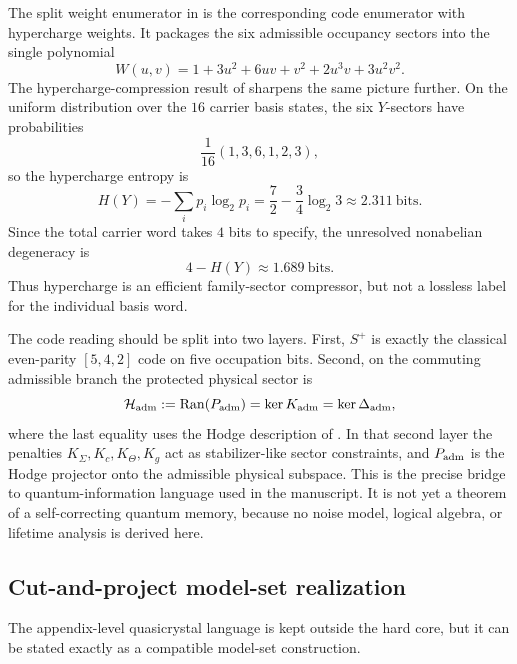 The split weight enumerator in  is the corresponding code enumerator with hypercharge weights. It packages the six admissible occupancy sectors into the single polynomial
\[
W(u,v)
=
1+3u^2+6uv+v^2+2u^3v+3u^2v^2.
\]
The hypercharge-compression result of  sharpens the same picture further. On the uniform distribution over the $16$ carrier basis states, the six $Y$-sectors have probabilities
\[
\frac1{16}(1,3,6,1,2,3),
\]
so the hypercharge entropy is
\[
H(Y)
=
-\sum_i p_i\log_2 p_i
=
\frac72-\frac34\log_2 3
\approx
\num{2.311}\ \text{bits}.
\]
Since the total carrier word takes $4$ bits to specify, the unresolved nonabelian degeneracy is
\[
4-H(Y)\approx \num{1.689}\ \text{bits}.
\]
Thus hypercharge is an efficient family-sector compressor, but not a lossless label for the individual basis word.

\begin{remark}
The code reading should be split into two layers. First, $S^+$ is exactly the classical even-parity $[5,4,2]$ code on five occupation bits. Second, on the commuting admissible branch the protected physical sector is
\[
\mathcal H_{\mathrm{adm}}
:=
\operatorname{Ran}(P_{\mathrm{adm}})
=
\ker K_{\mathrm{adm}}
=
\ker \Delta_{\mathrm{adm}},
\]
where the last equality uses the Hodge description of . In that second layer the penalties $K_\Sigma,K_c,K_\Theta,K_g$ act as stabilizer-like sector constraints, and $P_{\mathrm{adm}}$ is the Hodge projector onto the admissible physical subspace. This is the precise bridge to quantum-information language used in the manuscript. It is not yet a theorem of a self-correcting quantum memory, because no noise model, logical algebra, or lifetime analysis is derived here.
\end{remark}

\subsection{Cut-and-project model-set realization}

The appendix-level quasicrystal language is kept outside the hard core, but it can be stated
exactly as a compatible model-set construction.

